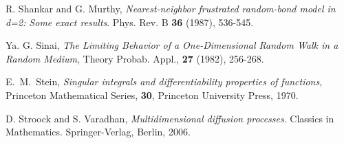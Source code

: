 \documentclass[reqno,11pt]{amsart}
\numberwithin{equation}{section}
\newcommand{\bbR}{{\ensuremath{\mathbb R}} }
\begin{document}
\begin{thebibliography}{99}

R. Shankar and G. Murthy, 
\emph{Nearest-neighbor frustrated random-bond model in \textit{d=2}: Some
  exact results}.
Phys. Rev. B \textbf{36} (1987), 536-545.



Ya. G. Sinai, \emph{The Limiting Behavior of a One-Dimensional Random Walk in a Random Medium},
 Theory Probab. Appl., {\bf 27} (1982), 256-268. 

E.~M.~Stein, \emph{ Singular integrals and differentiability properties of functions}, Princeton Mathematical Series, {\bf 30}, Princeton University Press, 1970.

D. Stroock and S. Varadhan,  
\emph{Multidimensional diffusion processes}.
Classics in Mathematics. Springer-Verlag, Berlin, 2006.


\end{thebibliography}
\end{document}
